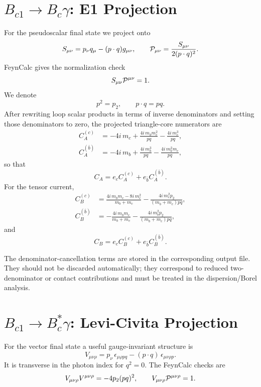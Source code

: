 \documentclass[11pt]{article}
\newcommand{\Bc}{B_c}
\newcommand{\Bcst}{B_c^\ast}
\newcommand{\BcOne}{B_{c1}}
\newcommand{\eps}{\epsilon}
\begin{document}
\section{\texorpdfstring{\(\BcOne\to\Bc\gamma\)}{Bc1 to Bc gamma}: E1 Projection}

For the pseudoscalar final state we project onto
\[
S_{\mu\nu}=p_\nu q_\mu-(p\cdot q)g_{\mu\nu},
\qquad
{\cal P}_{\mu\nu}=\frac{S_{\mu\nu}}{2(p\cdot q)^2}.
\]
FeynCalc gives the normalization check
\[
S_{\mu\nu}{\cal P}^{\mu\nu}=1 .
\]
We denote
\[
p^2=p_2,\qquad p\cdot q=pq .
\]
After rewriting loop scalar products in terms of inverse denominators and
setting those denominators to zero, the projected triangle-core numerators are
\[
\begin{aligned}
C_A^{(c)} &=
-4i\,m_c+\frac{4i\,m_bm_c^2}{pq}-\frac{4i\,m_c^3}{pq},\\
C_A^{(\bar b)} &=
-4i\,m_b+\frac{4i\,m_b^3}{pq}-\frac{4i\,m_b^2m_c}{pq},
\end{aligned}
\]
so that
\[
C_A=e_c C_A^{(c)}+e_{\bar b}C_A^{(\bar b)} .
\]
For the tensor current,
\[
\begin{aligned}
C_B^{(c)} &=
\frac{4i\,m_bm_c-8i\,m_c^2}{m_b+m_c}
-\frac{4i\,m_c^2p_2}{(m_b+m_c)pq},\\
C_B^{(\bar b)} &=
-\frac{4i\,m_bm_c}{m_b+m_c}
-\frac{4i\,m_b^2p_2}{(m_b+m_c)pq},
\end{aligned}
\]
and
\[
C_B=e_c C_B^{(c)}+e_{\bar b}C_B^{(\bar b)} .
\]

The denominator-cancellation terms are stored in the corresponding output file.
They should
not be discarded automatically; they correspond to reduced two-denominator or
contact contributions and must be treated in the dispersion/Borel analysis.

\section{\texorpdfstring{\(\BcOne\to\Bcst\gamma\)}{Bc1 to Bcstar gamma}: Levi-Civita Projection}

For the vector final state a useful gauge-invariant structure is
\[
V_{\mu\nu\rho}
=p_\nu\,\eps_{\mu\rho p q}
-(p\cdot q)\,\eps_{\mu\nu\rho p}.
\]
It is transverse in the photon index for \(q^2=0\).  The FeynCalc checks are
\[
V_{\mu\nu\rho}V^{\mu\nu\rho}=-4p_2(pq)^2,\qquad
V_{\mu\nu\rho}{\cal P}^{\mu\nu\rho}=1 .
\]
\end{document}

